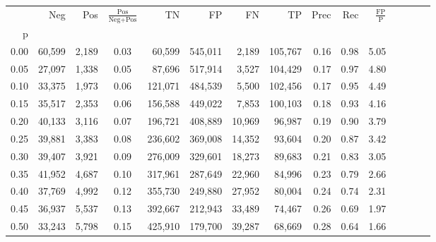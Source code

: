 \begin{tabular}{rrrcrrrrrrrrrrr}
\toprule
{} &     Neg &     Pos & $\frac{\text{Pos}}{\text{Neg}+\text{Pos}}$ &       TN &       FP &       FN &       TP &  Prec &   Rec & $\frac{\text{FP}}{\text{P}}$ \\
p    &         &         &                                            &          &          &          &          &       &       &                              \\
\midrule
0.00 &  60,599 &   2,189 &                                       0.03 &   60,599 &  545,011 &    2,189 &  105,767 &  0.16 &  0.98 &                         5.05 \\
0.05 &  27,097 &   1,338 &                                       0.05 &   87,696 &  517,914 &    3,527 &  104,429 &  0.17 &  0.97 &                         4.80 \\
0.10 &  33,375 &   1,973 &                                       0.06 &  121,071 &  484,539 &    5,500 &  102,456 &  0.17 &  0.95 &                         4.49 \\
0.15 &  35,517 &   2,353 &                                       0.06 &  156,588 &  449,022 &    7,853 &  100,103 &  0.18 &  0.93 &                         4.16 \\
0.20 &  40,133 &   3,116 &                                       0.07 &  196,721 &  408,889 &   10,969 &   96,987 &  0.19 &  0.90 &                         3.79 \\
0.25 &  39,881 &   3,383 &                                       0.08 &  236,602 &  369,008 &   14,352 &   93,604 &  0.20 &  0.87 &                         3.42 \\
0.30 &  39,407 &   3,921 &                                       0.09 &  276,009 &  329,601 &   18,273 &   89,683 &  0.21 &  0.83 &                         3.05 \\
0.35 &  41,952 &   4,687 &                                       0.10 &  317,961 &  287,649 &   22,960 &   84,996 &  0.23 &  0.79 &                         2.66 \\
0.40 &  37,769 &   4,992 &                                       0.12 &  355,730 &  249,880 &   27,952 &   80,004 &  0.24 &  0.74 &                         2.31 \\
0.45 &  36,937 &   5,537 &                                       0.13 &  392,667 &  212,943 &   33,489 &   74,467 &  0.26 &  0.69 &                         1.97 \\
0.50 &  33,243 &   5,798 &                                       0.15 &  425,910 &  179,700 &   39,287 &   68,669 &  0.28 &  0.64 &                         1.66 \\

\end{tabular}
